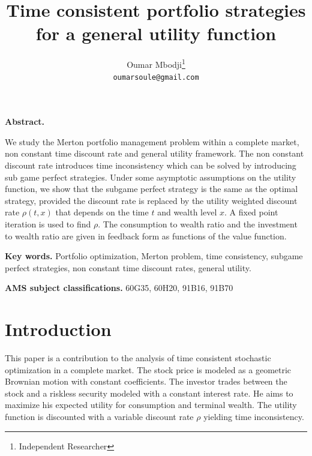 \documentclass[11pt, psfig]{article}
\theoremstyle{definition}
\theoremstyle{remark}
\numberwithin{equation}{section}
\begin{document}
\title{Time consistent portfolio strategies for a general utility function}

\author{Oumar Mbodji\thanks{%
Independent Researcher}\\
\texttt{oumarsoule@gmail.com}%
}



\maketitle

\noindent \textbf{Abstract.}

We study the Merton portfolio management problem within a complete market, non constant time discount rate and general utility framework. The non constant discount rate introduces time inconsistency which can be solved by introducing sub game perfect strategies. 
Under some asymptotic assumptions on the utility function, we show that the subgame perfect strategy is the same as the optimal strategy, provided the discount rate is replaced by the utility weighted discount rate $\rho(t,x)$ that depends on the time $t$ and wealth level $x$. A fixed point iteration is used to find $\rho$. The consumption to wealth ratio and the investment to wealth ratio are given in feedback form as functions of the value function.


\vspace*{7mm}



\noindent \textbf{Key words.} Portfolio optimization, Merton problem, time consistency, 
subgame perfect strategies, non constant time discount rates, general utility.

\vspace*{5mm}

\noindent \textbf{AMS subject classifications.} 60G35, 60H20, 91B16, 91B70


\section{Introduction}

This paper is a contribution to the analysis of time consistent stochastic optimization in a complete market. The stock price is modeled as a geometric Brownian motion with constant coefficients. The investor trades between the stock and a riskless security modeled with a constant interest rate. He aims to maximize his expected utility for consumption and terminal wealth. The utility function is discounted with a variable discount rate $\rho$ yielding time inconsistency.
\end{document}
